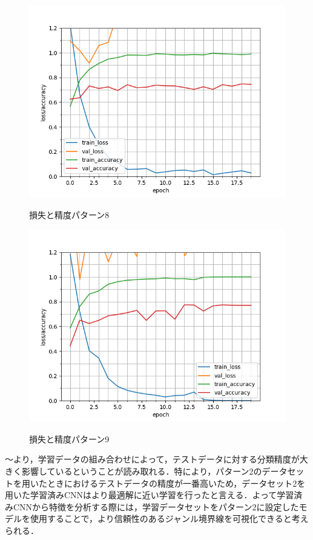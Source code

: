 \begin{figure}
	\begin{center}
		\includegraphics[scale=0.8]{./images/classify-model/loss_acuuracy_CNN_mel_8.png}
		\caption{損失と精度パターン8}
		\label{fig:CNNmel8}
		\includegraphics[scale=0.8]{./images/classify-model/loss_acuuracy_CNN_mel_9.png}
		\caption{損失と精度パターン9}
		\label{fig:CNNmel9}
	\end{center}
\end{figure}

\newpage
{}～より，学習データの組み合わせによって，テストデータに対する分類精度が大きく影響しているということが読み取れる．特により，パターン2のデータセットを用いたときにおけるテストデータの精度が一番高いため，データセット2を用いた学習済みCNNはより最適解に近い学習を行ったと言える．よって学習済みCNNから特徴を分析する際には，学習データセットをパターン2に設定したモデルを使用することで，より信頼性のあるジャンル境界線を可視化できると考えられる．

